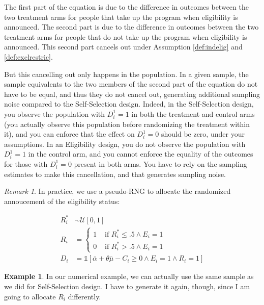 \documentclass[
]{book}
\newcommand{\uns}[1]{\mathds{1}[ #1 ]}
\theoremstyle{definition}
\theoremstyle{definition}
\newtheorem{example}{Example}[chapter]
\theoremstyle{definition}
\theoremstyle{definition}
\theoremstyle{remark}
\newtheorem*{remark}{Remark}
\begin{document}
The first part of the equation is due to the difference in outcomes between the two treatment arms for people that take up the program when eligibility is announced.
The second part is due to the difference in outcomes between the two treatment arms for people that do not take up the program when eligibility is announced.
This second part cancels out under Assumption \ref{def:indelig} and \ref{def:exclrestric}.

But this cancelling out only happens in the population.
In a given sample, the sample equivalents to the two members of the second part of the equation do not have to be equal, and thus they do not cancel out, generating additional sampling noise compared to the Self-Selection design.
Indeed, in the Self-Selection design, you observe the population with \(D_i^1=1\) in both the treatment and control arms (you actually observe this population before randomizing the treatment within it), and you can enforce that the effect on \(D_i^1=0\) should be zero, under your assumptions.
In an Eligibility design, you do not observe the population with \(D_i^1=1\) in the control arm, and you cannot enforce the equality of the outcomes for those with \(D_i^1=0\) present in both arms.
You have to rely on the sampling estimates to make this cancellation, and that generates sampling noise.

\begin{remark}
\iffalse{} {Remark. } \fi{}In practice, we use a pseudo-RNG to allocate the randomized annoucement of the eligibility status:
\end{remark}

\begin{align*}
  R_i^* & \sim \mathcal{U}[0,1]\\
  R_i & = 
  \begin{cases}
    1 & \text{ if } R_i^*\leq .5 \land E_i=1\\
    0 & \text{ if } R_i^*> .5 \land E_i=1
  \end{cases} \\
  D_i & = \uns{\bar{\alpha}+\theta\bar{\mu}-C_i\geq0 \land E_i=1 \land R_i=1}
\end{align*}

\begin{example}
\protect\hypertarget{exm:unnamed-chunk-93}{}{\label{exm:unnamed-chunk-93} }In our numerical example, we can actually use the same sample as we did for Self-Selection design.
I have to generate it again, though, since I am going to allocate \(R_i\) differently.
\end{example}
\end{document}

